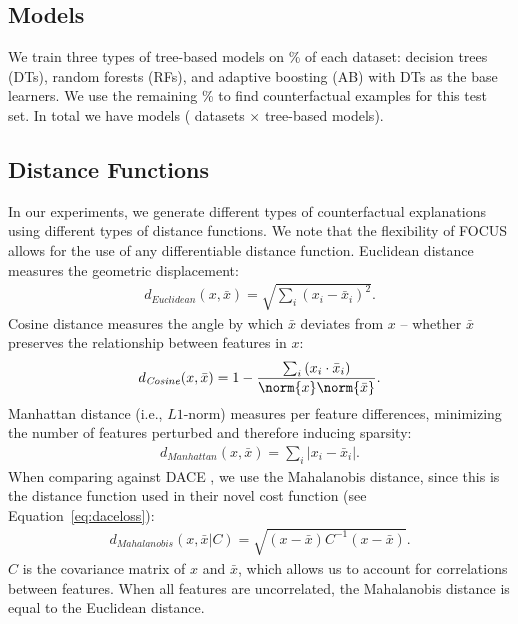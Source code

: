 \subsection{Models}
We train three types of tree-based models on \% of each dataset: decision trees (DTs), random forests (RFs), and adaptive boosting (AB) with DTs as the base learners. 
We use the remaining \% to find counterfactual examples for this test set. 
In total we have  models ( datasets $\times$  tree-based models). 


\subsection{Distance Functions}
\label{section:distance-metrics}
In our experiments, we generate different types of counterfactual explanations using different types of distance functions. 
We note that the flexibility of FOCUS allows for the use of any differentiable distance function. 
Euclidean distance measures the geometric displacement: 
%
\begin{align}
\label{eq:euclidean}
d_\mathit{Euclidean}(x, \bar{x}) = \sqrt{\sum_{i} (x_i - \bar{x}_i)^2}.
\end{align}
%
Cosine distance measures the angle by which $\bar{x}$ deviates from $x$ -- whether $\bar{x}$ preserves the relationship between features in $x$:
%
\begin{align}
\label{eq:cosine}
d_\mathit{Cosine}(x, \bar{x}) = 1 - \frac{\sum_{i} \left( x_i \cdot \bar{x}_i \right)}{\norm{x} \norm{\bar{x}}}.
\end{align}
%
Manhattan distance (i.e., $L1$-norm) measures per feature differences, minimizing the number of features perturbed and therefore inducing sparsity:
%
\begin{align}
\label{eq:manhatten}
d_\mathit{Manhattan}(x, \bar{x}) = \sum_{i} |x_i - \bar{x}_i|.
\end{align}
%
When comparing against DACE \citep{kanamori_dace_2020}, we use the Mahalanobis distance, since this is the distance function used in their novel cost function (see Equation~\ref{eq:daceloss}):
\begin{align}
\label{eq:mahal}
d_\mathit{Mahalanobis}(x, \bar{x}|C) = \sqrt{(x - \bar{x})C^{-1}(x - \bar{x})}.
\end{align}
$C$ is the covariance matrix of $x$ and $\bar{x}$, which allows us to account for correlations between features. 
When all features are uncorrelated, the Mahalanobis distance is equal to the Euclidean distance. 





